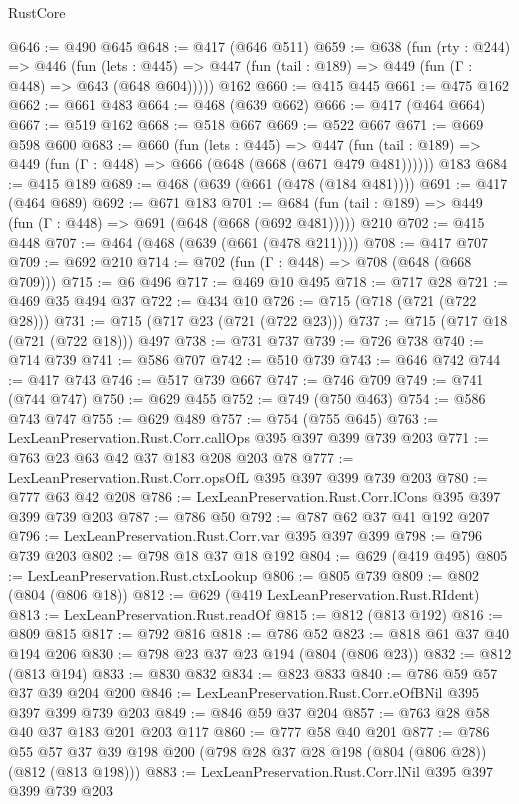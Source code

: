 \begin{lexlean}{RustCore}
\begin{coremodule}
@646 := @490 @645
@648 := @417 (@646 @511)
@659 := @638
    (fun (rty : @244) =>
    @446
      (fun (lets : @445) => @447 (fun (tail : @189) => @449 (fun (Γ : @448) => @643 (@648 @604)))))
    @162
@660 := @415 @445
@661 := @475 @162
@662 := @661 @483
@664 := @468 (@639 @662)
@666 := @417 (@464 @664)
@667 := @519 @162
@668 := @518 @667
@669 := @522 @667
@671 := @669 @598 @600
@683 := @660
    (fun (lets : @445) =>
    @447 (fun (tail : @189) => @449 (fun (Γ : @448) => @666 (@648 (@668 (@671 @479 @481))))))
    @183
@684 := @415 @189
@689 := @468 (@639 (@661 (@478 (@184 @481))))
@691 := @417 (@464 @689)
@692 := @671 @183
@701 := @684 (fun (tail : @189) => @449 (fun (Γ : @448) => @691 (@648 (@668 (@692 @481))))) @210
@702 := @415 @448
@707 := @464 (@468 (@639 (@661 (@478 @211))))
@708 := @417 @707
@709 := @692 @210
@714 := @702 (fun (Γ : @448) => @708 (@648 (@668 @709)))
@715 := @6 @496
@717 := @469 @10 @495
@718 := @717 @28
@721 := @469 @35 @494 @37
@722 := @434 @10
@726 := @715 (@718 (@721 (@722 @28)))
@731 := @715 (@717 @23 (@721 (@722 @23)))
@737 := @715 (@717 @18 (@721 (@722 @18))) @497
@738 := @731 @737
@739 := @726 @738
@740 := @714 @739
@741 := @586 @707
@742 := @510 @739
@743 := @646 @742
@744 := @417 @743
@746 := @517 @739 @667
@747 := @746 @709
@749 := @741 (@744 @747)
@750 := @629 @455
@752 := @749 (@750 @463)
@754 := @586 @743 @747
@755 := @629 @489
@757 := @754 (@755 @645)
@763 := LexLeanPreservation.Rust.Corr.callOps @395 @397 @399 @739 @203
@771 := @763 @23 @63 @42 @37 @183 @208 @203 @78
@777 := LexLeanPreservation.Rust.Corr.opsOfL @395 @397 @399 @739 @203
@780 := @777 @63 @42 @208
@786 := LexLeanPreservation.Rust.Corr.lCons @395 @397 @399 @739 @203
@787 := @786 @50
@792 := @787 @62 @37 @41 @192 @207
@796 := LexLeanPreservation.Rust.Corr.var @395 @397 @399
@798 := @796 @739 @203
@802 := @798 @18 @37 @18 @192
@804 := @629 (@419 @495)
@805 := LexLeanPreservation.Rust.ctxLookup
@806 := @805 @739
@809 := @802 (@804 (@806 @18))
@812 := @629 (@419 LexLeanPreservation.Rust.RIdent)
@813 := LexLeanPreservation.Rust.readOf
@815 := @812 (@813 @192)
@816 := @809 @815
@817 := @792 @816
@818 := @786 @52
@823 := @818 @61 @37 @40 @194 @206
@830 := @798 @23 @37 @23 @194 (@804 (@806 @23))
@832 := @812 (@813 @194)
@833 := @830 @832
@834 := @823 @833
@840 := @786 @59 @57 @37 @39 @204 @200
@846 := LexLeanPreservation.Rust.Corr.eOfBNil @395 @397 @399 @739 @203
@849 := @846 @59 @37 @204
@857 := @763 @28 @58 @40 @37 @183 @201 @203 @117
@860 := @777 @58 @40 @201
@877 := @786 @55 @57 @37 @39 @198 @200 (@798 @28 @37 @28 @198 (@804 (@806 @28)) (@812 (@813 @198)))
@883 := LexLeanPreservation.Rust.Corr.lNil @395 @397 @399 @739 @203

\end{coremodule}
\end{lexlean}
